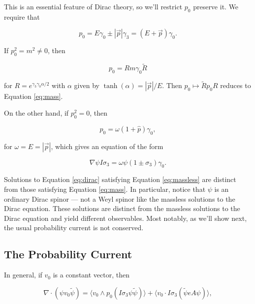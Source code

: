 \documentclass{article}
\begin{document}
  This is an essential feature of Dirac theory, so we'll restrict $p_0$ preserve it. We require that

  \begin{equation}
    p_0 = E \gamma_0 \pm |\vec p| \gamma_3 = (E + \vec p) \gamma_0.
  \end{equation} 

  If $p_0^2 = m^2 \not= 0$, then 

  \begin{equation}
    p_0 = R m \gamma_0 \widetilde R
  \end{equation} 

   for $R = e^{\gamma_3 \gamma_0 \alpha/2}$ with $\alpha$ given by $\tanh(\alpha) = |\vec p|/E$. Then $p_0 \mapsto \widetilde R p_0 R$ reduces to Equation \ref{eq:mass}.

  On the other hand, if $p_0^2 = 0$, then

  \begin{equation}
    p_0 = \omega (1 + \hat p) \gamma_0, \label{eq:massless}
  \end{equation}

  for $\omega = E = |\vec p|$, which gives an equation of the form

  \begin{equation}
    \nabla \psi I \sigma_3 = \omega \psi (1 \pm \sigma_3) \gamma_0.\label{eq:extension}
  \end{equation}

  Solutions to Equation \ref{eq:dirac} satisfying Equation \ref{eq:massless} are distinct from those satisfying Equation \ref{eq:mass}. In particular, notice that $\psi$ is an ordinary Dirac spinor --- not a Weyl spinor like the massless solutions to the Dirac equation. These solutions are distinct from the massless solutions to the Dirac equation and yield different observables. Most notably, as we'll show next, the usual probability current is not conserved.

  \subsection{The Probability Current}

  In general, if $v_0$ is a constant vector, then

  \begin{equation}
    \nabla \cdot (\psi v_0 \widetilde \psi) = \langle v_0 \wedge p_0 (I \sigma_3 \psi \widetilde \psi) \rangle + \langle v_0 \cdot I \sigma_3 (\widetilde \psi e A \psi) \rangle,
  \end{equation}
\end{document}
